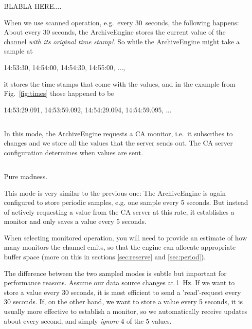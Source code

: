 BLABLA HERE....


When we use scanned operation, e.g.\ every 30~seconds, the following
happens: About every 30 seconds, the ArchiveEngine stores the current
value of the channel \emph{with its original time stamp!}.
So while the ArchiveEngine might take a sample at
\begin{center}
14:53:30, 14:54:00, 14:54:30, 14:55:00, ...,
\end{center}
it stores the time stamps that come with the values, and in the
example from Fig.~\ref{fig:times} those happened to be
\begin{center}
14:53:29.091,  14:53:59.092, 14:54:29.094,  14:54:59.095, ...
\end{center}






\subsection{}

In this mode, the ArchiveEngine requests a CA monitor, i.e.\ it
subscribes to changes and we store all the values that the server
sends out. The CA server configuration determines when values are sent.





\subsection{}
Pure madness.

This mode is very similar to the previous one:
The ArchiveEngine is again configured to store periodic samples,
e.g. one sample every 5 seconds. But instead of actively requesting a
value from the CA server at this rate, it establishes a monitor and
only saves a value every 5 seconds.

When selecting monitored operation, you will need to provide an
estimate of how many monitors the channel emits, so that the engine
can allocate appropriate buffer space (more on this in sections
\ref{sec:reserve} and \ref{sec:period}).

The difference between the two sampled modes is subtle but important
for performance reasons. Assume our data source changes at 1~Hz. If
we want to store a value every 30 seconds, it is most efficient to
send a 'read'-request every 30 seconds. If, on the other hand, we want
to store a value every 5 seconds, it is usually more effective to
establish a monitor, so we automatically receive updates about every
second, and simply \emph{ignore} 4 of the 5 values.

